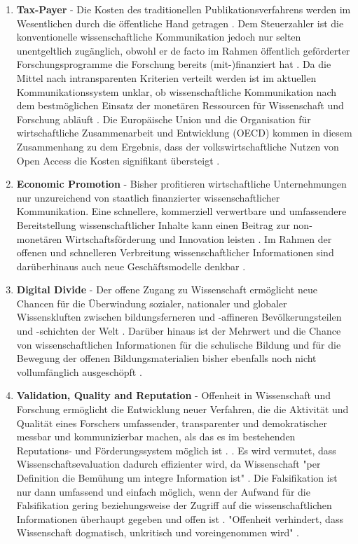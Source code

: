\begin{enumerate}
\item \textbf{Tax-Payer} - Die Kosten des traditionellen Publikationsverfahrens werden im Wesentlichen durch die öffentliche Hand getragen \cite{muller_2010_open}. Dem Steuerzahler ist die konventionelle wissenschaftliche Kommunikation jedoch nur selten unentgeltlich zugänglich, obwohl er de facto im Rahmen öffentlich geförderter Forschungsprogramme die Forschung bereits (mit-)finanziert hat \cite{suber_2003_taxpayer} \cite{resnik_2005_ethics} \cite{Baggs_2006} \cite{Woelfle_2011} \cite{Beverungen_2012} \cite{Adema_2014_open_access}. Da die Mittel nach intransparenten Kriterien verteilt werden ist im aktuellen Kommunikationssystem unklar, ob wissenschaftliche Kommunikation nach dem bestmöglichen Einsatz der monetären Ressourcen für Wissenschaft und Forschung abläuft \cite{Glasziou_2014} \cite{altman_1994_scandal}. Die Europäische Union und die Organisation für wirtschaftliche Zusammenarbeit und Entwicklung (OECD) kommen in diesem Zusammenhang zu dem Ergebnis, dass der volkswirtschaftliche Nutzen von Open Access die Kosten signifikant übersteigt \cite{WD_bundestag_2009}.
\item \textbf{Economic Promotion} - Bisher profitieren wirtschaftliche Unternehmungen nur unzureichend von staatlich finanzierter wissenschaftlicher Kommunikation. Eine schnellere, kommerziell verwertbare und umfassendere Bereitstellung wissenschaftlicher Inhalte kann einen Beitrag zur non-monetären Wirtschaftsförderung und Innovation leisten \cite{heise_2012} \cite{suchen OECD EU}. Im Rahmen der offenen und schnelleren Verbreitung wissenschaftlicher Informationen sind darüberhinaus auch neue Geschäftsmodelle denkbar \cite{suchen}.
\item \textbf{Digital Divide} - Der offene Zugang zu Wissenschaft ermöglicht neue Chancen für die Überwindung sozialer, nationaler und globaler Wissenskluften \cite{suchen} zwischen bildungsferneren und -affineren Bevölkerungsteilen und -schichten der Welt \cite{boai_2012}. Darüber hinaus ist der Mehrwert und die Chance von wissenschaftlichen Informationen für die schulische Bildung und für die Bewegung der offenen Bildungsmaterialien bisher ebenfalls noch nicht vollumfänglich ausgeschöpft \cite{heise_lernen_2013}.
\item \textbf{Validation, Quality and Reputation} - Offenheit in Wissenschaft und Forschung ermöglicht die Entwicklung neuer Verfahren, die die Aktivität und Qualität eines Forschers umfassender, transparenter und demokratischer messbar und kommunizierbar machen, als das es im bestehenden Reputations- und Förderungssystem möglich ist \cite{grand_2012_open}. \cite{chalmers_2009_avoidable_waste}. Es wird vermutet, dass Wissenschaftsevaluation dadurch effizienter wird, da Wissenschaft "per Definition die Bemühung um integre Information ist" \cite{umstatter_2007_qualitatssicherung}. Die Falsifikation ist nur dann umfassend und einfach möglich, wenn der Aufwand für die Falsifikation gering beziehungsweise der Zugriff auf die wissenschaftlichen Informationen überhaupt gegeben \cite{umstatter_2007_qualitatssicherung} und offen ist \cite{Peters_2014}. "Offenheit verhindert, dass Wissenschaft dogmatisch, unkritisch und voreingenommen wird" \cite{resnik_2005_ethics}.

\end{enumerate}
